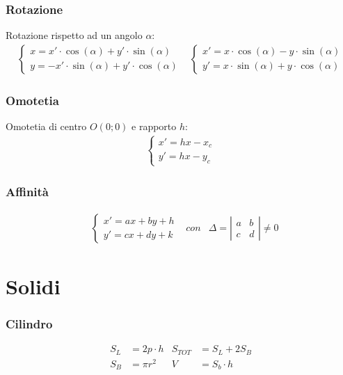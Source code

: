 \documentclass[a4paper]{article}
\begin{document}
	\subsubsection{Rotazione}
	Rotazione rispetto ad un angolo $\alpha$:
	\begin{align*}
		\begin{cases}
			x=x' \cdot \cos (\alpha) + y' \cdot \sin(\alpha)\\
			y= -x' \cdot \sin (\alpha) + y' \cdot \cos(\alpha)
		\end{cases}&
		\begin{cases}
			x'= x \cdot \cos (\alpha) - y \cdot \sin(\alpha)\\
			y'= x \cdot \sin (\alpha) + y \cdot \cos(\alpha)
		\end{cases}
	\end{align*}
	\subsubsection{Omotetia}
	Omotetia di centro $O(0;0)$ e rapporto $h$:
		\begin{align*}
	\begin{cases}
	x' = hx - x_c\\
	y' = hx - y_c
	\end{cases}
	\end{align*}
	\subsubsection{Affinità}
	\begin{align*}
		&\begin{cases}
			x'=ax+by+h\\
			y'=cx+dy+k
		\end{cases}&
		con &\varDelta = \left| \begin{matrix}
		a & b \\ 
		c & d
		\end{matrix}
		\right|\neq 0
	\end{align*}
	
	\newpage
	\section{Solidi}
	\subsubsection{Cilindro}
	\begin{align*}
		S_L & = 2p \cdot h & S_{TOT} & = S_L + 2S_B  \\
		S_B & = \pi r^2    & V       & = S_b \cdot h
	\end{align*}
	\\
\end{document}
